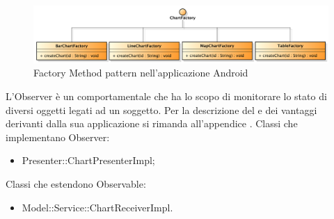                 \begin{figure}[H]\centering
	        		\includegraphics[width=\textwidth]{SpecificaTecnica/Pics/DesignPatternNorris/Factory2}
	        		\caption{Factory Method pattern nell'applicazione Android}
	    		\end{figure}

                
            L'Observer è un  comportamentale che ha lo scopo di monitorare lo stato di diversi oggetti legati ad un soggetto. Per la descrizione del  e dei vantaggi derivanti dalla sua applicazione si rimanda all'appendice .
                Classi che implementano Observer:
                \begin{itemize}
                    \item Presenter::ChartPresenterImpl;
                \end{itemize}
                Classi che estendono Observable:
                \begin{itemize}
                    \item Model::Service::ChartReceiverImpl.
                \end{itemize}
                
